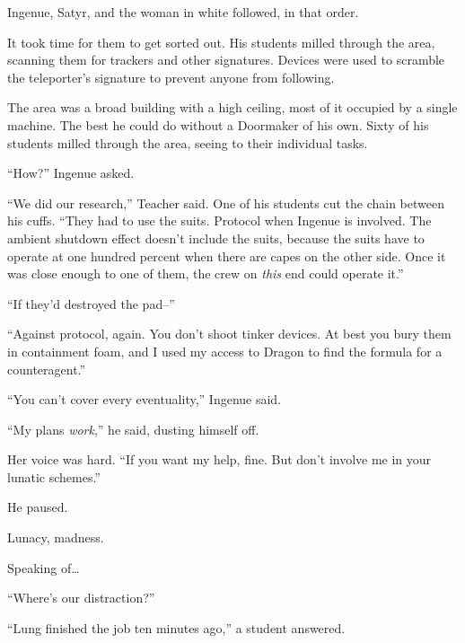 Ingenue, Satyr, and the woman in white followed, in that order.



It took time for them to get sorted out.  His students milled through the area, scanning them for trackers and other signatures.  Devices were used to scramble the teleporter's signature to prevent anyone from following.



The area was a broad building with a high ceiling, most of it occupied by a single machine.  The best he could do without a Doormaker of his own.  Sixty of his students milled through the area, seeing to their individual tasks.



``How?'' Ingenue asked.



``We did our research,'' Teacher said.  One of his students cut the chain between his cuffs.  ``They had to use the suits.  Protocol when Ingenue is involved.  The ambient shutdown effect doesn't include the suits, because the suits have to operate at one hundred percent when there are capes on the other side.  Once it was close enough to one of them, the crew on \emph{this} end could operate it.''



``If they'd destroyed the pad--''



``Against protocol, again.  You don't shoot tinker devices.  At best you bury them in containment foam, and I used my access to Dragon to find the formula for a counteragent.''



``You can't cover every eventuality,'' Ingenue said.



``My plans \emph{work},'' he said, dusting himself off.



Her voice was hard.  ``If you want my help, fine.  But don't involve me in your lunatic schemes.''



He paused.



Lunacy, madness.



Speaking of\ldots



``Where's our distraction?''



``Lung finished the job ten minutes ago,'' a student answered.



